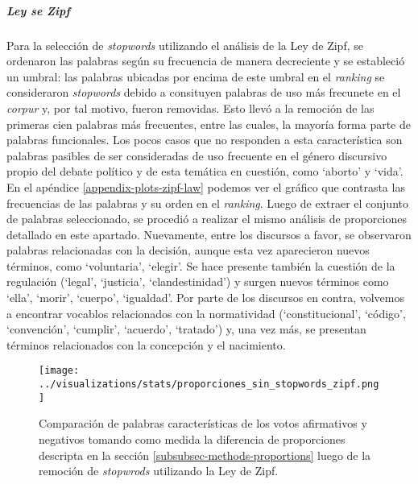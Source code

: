 \subparagraph{Ley se Zipf}
Para la selecci\'on de \textit{stopwords} utilizando el an\'alisis de la Ley de Zipf,
se ordenaron las palabras seg\'un su frecuencia de manera decreciente y se estableci\'o
un umbral: las palabras ubicadas por encima de este umbral en el \textit{ranking}
se consideraron \textit{stopwords} debido a consituyen palabras de uso m\'as
frecunete en el \textit{corpur} y, por tal motivo, fueron removidas.
Esto llev\'o a la remoci\'on de las primeras cien palabras m\'as frecuentes, entre 
las cuales, la mayor\'ia forma parte de palabras funcionales.
Los pocos casos que no responden a esta caracter\'istica son palabras pasibles de
ser consideradas de uso frecuente en el g\'enero discursivo propio del debate pol\'itico
y de esta tem\'atica en cuesti\'on, como `aborto' y `vida'.
En el ap\'endice \ref{appendix-plots-zipf-law} podemos ver el gr\'afico que contrasta
las frecuencias de las palabras y su orden en el \textit{ranking}.
Luego de extraer el conjunto de palabras seleccionado, se procedi\'o a realizar el
mismo an\'alisis de proporciones detallado en este apartado. Nuevamente, entre
los discursos a favor, se observaron palabras relacionadas con la decisi\'on, aunque
esta vez aparecieron nuevos t\'erminos, como `voluntaria', `elegir'. Se hace presente
tambi\'en la cuesti\'on de la regulaci\'on (`legal', `justicia', `clandestinidad') y
surgen nuevos t\'erminos como `ella', `morir', `cuerpo', `igualdad'.
Por parte de los discursos en contra, volvemos a encontrar vocablos relacionados
con la normatividad (`constitucional', `c\'odigo', `convenci\'on', `cumplir', 
`acuerdo', `tratado') y, una vez m\'as, se presentan t\'erminos relacionados
con la concepci\'on y el nacimiento.

\begin{figure}[h!]
    \centering
    \texttt{[image: ../visualizations/stats/proporciones\_sin\_stopwords\_zipf.png]}
    \caption{Comparaci\'on de palabras caracter\'isticas de los votos afirmativos y
    negativos tomando como medida la diferencia de proporciones descripta
    en la secci\'on \ref{subsubsec-methods-proportions} luego de la remoci\'on de
    \textit{stopwrods} utilizando la Ley de Zipf.}
    \label{fig-statistics-proportions-zipf}
\end{figure}

